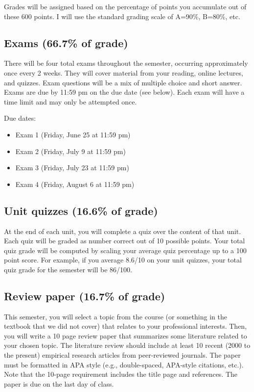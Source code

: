 \documentclass[10pt]{article}
\begin{document}
Grades will be assigned based on the percentage of points you accumulate out of these 600 points.  I will use the standard grading scale of A=90\%, B=80\%, etc.

\subsection*{Exams (66.7\% of grade)}
\label{sec:org4938bbe}
There will be four total exams throughout the semester, occurring approximately once every 2 weeks.  They will cover material from your reading, online lectures, and quizzes.  Exam questions will be a mix of multiple choice and short answer.  Exams are due by 11:59 pm on the due date (see below).  Each exam will have a time limit and may only be attempted once.

Due dates:

\begin{itemize}
\item Exam 1 (Friday, June 25 at 11:59 pm)
\item Exam 2 (Friday, July 9 at 11:59 pm)
\item Exam 3 (Friday, July 23 at 11:59 pm)
\item Exam 4 (Friday, August 6 at 11:59 pm)
\end{itemize}

\subsection*{Unit quizzes (16.6\% of grade)}
\label{sec:orge28e74a}
At the end of each unit, you will complete a quiz over the content of that  unit. Each quiz will be graded as number correct out of 10 possible points.  Your total quiz grade will be computed by scaling your average quiz percentage up to a 100 point score.  For example, if you average 8.6/10 on your unit quizzes, your total quiz grade for the semester will be 86/100. 

\subsection*{Review paper (16.7\% of grade)}
\label{sec:org7430218}
This semester, you will select a topic from the course (or something in the textbook that we did not cover) that relates to your professional interests.  Then, you will write a 10 page review paper that summarizes some literature related to your chosen topic. The literature review should include at least 10 recent (2000 to the present) empirical research articles from peer-reviewed journals. The paper must be formatted in APA style (e.g., double-spaced, APA-style citations, etc.).  Note that the 10-page requirement includes the title page and references.  The paper is due on the last day of class.   
\end{document}
